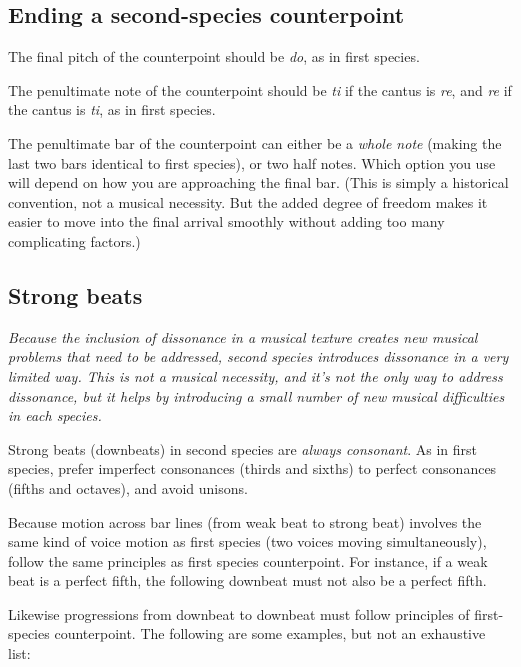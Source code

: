 \documentclass{book}
\begin{document}
\hypertarget{ending-a-second-species-counterpoint}{%
\subsection{Ending a second-species
counterpoint}\label{ending-a-second-species-counterpoint}}

The final pitch of the counterpoint should be \emph{do}, as in first species.

The penultimate note of the counterpoint should be \emph{ti} if the cantus is
\emph{re}, and \emph{re} if the cantus is \emph{ti}, as in first species.

The penultimate bar of the counterpoint can either be a \emph{whole note}
(making the last two bars identical to first species), or two half notes.
Which option you use will depend on how you are approaching the final bar.
(This is simply a historical convention, not a musical necessity. But the
added degree of freedom makes it easier to move into the final arrival
smoothly without adding too many complicating factors.)

\hypertarget{strong-beats}{%
\subsection{Strong beats}\label{strong-beats}}

\emph{Because the inclusion of dissonance in a musical texture creates new
musical problems that need to be addressed, second species introduces
dissonance in a very limited way. This is not a musical necessity, and it's
not the only way to address dissonance, but it helps by introducing a small
number of new musical difficulties in each species.}

Strong beats (downbeats) in second species are \emph{always consonant}. As in
first species, prefer imperfect consonances (thirds and sixths) to perfect
consonances (fifths and octaves), and avoid unisons.

Because motion across bar lines (from weak beat to strong beat) involves the
same kind of voice motion as first species (two voices moving simultaneously),
follow the same principles as first species counterpoint. For instance, if a
weak beat is a perfect fifth, the following downbeat must not also be a
perfect fifth.

Likewise progressions from downbeat to downbeat must follow principles of
first-species counterpoint. The following are some examples, but not an
exhaustive list:
\end{document}
